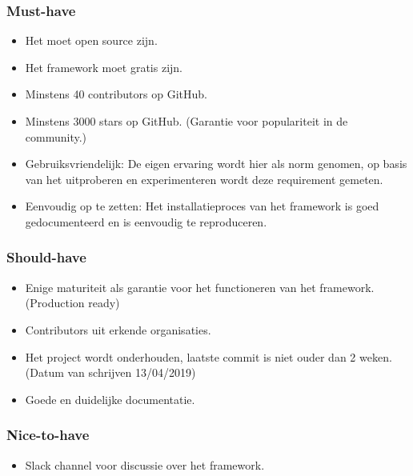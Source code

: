 \subsubsection{Must-have}
\begin{itemize}
    \item Het moet open source zijn.
    \item Het framework moet gratis zijn.
    \item Minstens 40 contributors op GitHub.
    \item Minstens 3000 stars op GitHub. (Garantie voor populariteit in de community.)
    \item Gebruiksvriendelijk: De eigen ervaring wordt hier als norm genomen, op basis van het uitproberen en experimenteren wordt deze requirement gemeten.
    \item Eenvoudig op te zetten: Het installatieproces van het framework is goed gedocumenteerd en is eenvoudig te reproduceren.
\end{itemize}
\subsubsection{Should-have}
\begin{itemize}
    \item Enige maturiteit als garantie voor het functioneren van het framework. (Production ready)
    \item Contributors uit erkende organisaties.
    \item Het project wordt onderhouden, laatste commit is niet ouder dan 2 weken. (Datum van schrijven 13/04/2019)
    \item Goede en duidelijke documentatie.
\end{itemize}
\subsubsection{Nice-to-have}
\begin{itemize}
    \item Slack channel voor discussie over het framework.
\end{itemize}

